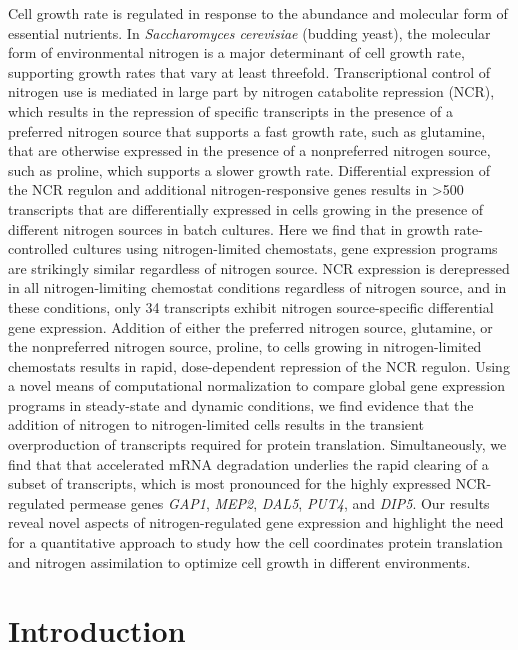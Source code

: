Cell growth rate is
regulated in response to the abundance and molecular form of essential
nutrients. In \textit{Saccharomyces cerevisiae} (budding yeast), the molecular
form of environmental nitrogen is a major determinant of cell growth
rate, supporting growth rates that vary at least threefold.
Transcriptional control of nitrogen use is mediated in large part by
nitrogen catabolite repression (NCR), which results in the repression
of specific transcripts in the presence of a preferred nitrogen source
that supports a fast growth rate, such as glutamine, that are
otherwise expressed in the presence of a nonpreferred nitrogen source,
such as proline, which supports a slower growth rate. Differential
expression of the NCR regulon and additional nitrogen-responsive genes
results in >500 transcripts that are differentially expressed in cells
growing in the presence of different nitrogen sources in batch
cultures. Here we find that in growth rate-controlled cultures using
nitrogen-limited chemostats, gene expression programs are strikingly
similar regardless of nitrogen source. NCR expression is derepressed
in all nitrogen-limiting chemostat conditions regardless of nitrogen
source, and in these conditions, only 34 transcripts exhibit nitrogen
source-specific differential gene expression. Addition of either the
preferred nitrogen source, glutamine, or the nonpreferred nitrogen
source, proline, to cells growing in nitrogen-limited chemostats
results in rapid, dose-dependent repression of the NCR regulon. Using
a novel means of computational normalization to compare global gene
expression programs in steady-state and dynamic conditions, we find
evidence that the addition of nitrogen to nitrogen-limited cells
results in the transient overproduction of transcripts required for
protein translation. Simultaneously, we find that that accelerated
mRNA degradation underlies the rapid clearing of a subset of
transcripts, which is most pronounced for the highly expressed
NCR-regulated permease genes \textit{GAP1}, \textit{MEP2}, 
\textit{DAL5}, \textit{PUT4}, and \textit{DIP5}. Our
results reveal novel aspects of nitrogen-regulated gene expression and
highlight the need for a quantitative approach to study how the cell
coordinates protein translation and nitrogen assimilation to optimize
cell growth in different environments.  

\section{Introduction}

